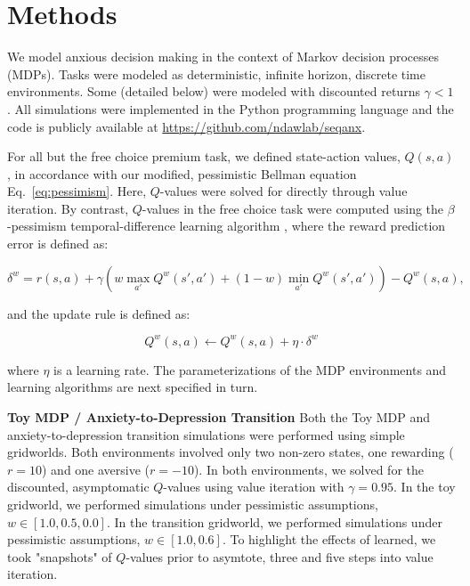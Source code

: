 \documentclass[11pt]{article} %
\begin{document}
\section{Methods}

We model anxious decision making in the context of Markov decision processes (MDPs). Tasks were modeled as deterministic, infinite horizon, discrete time environments. Some (detailed below) were modeled with discounted returns $\gamma < 1$. All simulations were implemented in the Python programming language and the code is publicly available at \url{https://github.com/ndawlab/seqanx}.

For all but the free choice premium task, we defined state-action values, $Q(s,a)$, in accordance with our modified, pessimistic Bellman equation Eq.~\ref{eq:pessimism}. Here, $Q$-values were solved for directly through value iteration. \citep{SuttonBarto2018} By contrast, $Q$-values in the free choice task were computed using the $\beta$-pessimism temporal-difference learning algorithm \citep{Gaskett2003}, where the reward prediction error is defined as:

\begin{equation*}
\delta^w = r(s,a) + \gamma \left( w \max_{a'} Q^w(s',a') + (1 - w) \min_{a'} Q^w(s',a') \right) - Q^w(s,a), 
\end{equation*}

and the update rule is defined as:

\begin{equation*}
Q^w(s,a) \leftarrow Q^w(s,a) + \eta \cdot \delta^w
\end{equation*}

where $\eta$ is a learning rate. The parameterizations of the MDP environments and learning algorithms are next specified in turn.

\textbf{Toy MDP / Anxiety-to-Depression Transition} Both the Toy MDP and anxiety-to-depression transition simulations were performed using simple gridworlds. Both environments involved only two non-zero states, one rewarding ($r=10$) and one aversive ($r=-10$). In both environments, we solved for the discounted, asymptomatic $Q$-values using value iteration with $\gamma = 0.95$. In the toy gridworld, we performed simulations under pessimistic assumptions, $w \in [1.0, 0.5, 0.0]$. In the transition gridworld, we performed simulations under pessimistic assumptions, $w \in [1.0, 0.6]$. To highlight the effects of learned, we took "snapshots" of $Q$-values prior to asymtote, three and five steps into value iteration. 
\end{document}
